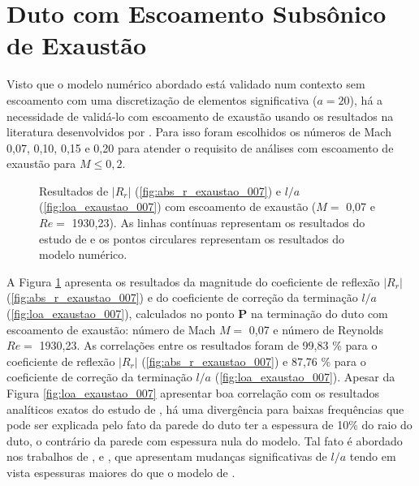 



\newpage
\section{Duto com Escoamento Subsônico de Exaustão}

Visto que o modelo numérico abordado está validado num contexto sem escoamento com uma discretização de elementos significativa ($a = 20$), há a necessidade de validá-lo com escoamento de exaustão usando os resultados na literatura desenvolvidos por . Para isso foram escolhidos os números de Mach 0,07, 0,10, 0,15 e 0,20 para atender o requisito de  análises com escoamento de exaustão para $M \leq 0,2$.

\begin{figure}[ht!]
\begin{subfigure}{\scaleA \textwidth}
  
\end{subfigure}%
\begin{subfigure}{\scaleA \textwidth}
  
\end{subfigure}
\caption[Resultados de $|R_{r}|$ e $l/a$ com escoamento de exaustão ($M =$ 0,07 e $Re =$ 1930,23)]{Resultados de $|R_{r}|$ (\ref{fig:abs_r_exaustao_007}) e $l/a$ (\ref{fig:loa_exaustao_007}) com escoamento de exaustão ($M =$ 0,07 e $Re =$ 1930,23). As linhas contínuas representam os resultados do estudo de  e os pontos circulares representam os resultados do modelo numérico.}
\label{fig:resultados_exaustao_007}
\end{figure}

A Figura \ref{fig:resultados_exaustao_007} apresenta os resultados da magnitude do coeficiente de reflexão $|R_{r}|$ (\ref{fig:abs_r_exaustao_007}) e do coeficiente de correção da terminação $l/a$ (\ref{fig:loa_exaustao_007}), calculados no ponto $\textbf{P}$ na terminação do duto com escoamento de exaustão: número de Mach $M =$ 0,07 e número de Reynolds $Re =$ 1930,23.  As correlações entre os resultados foram de 99,83 \% para o coeficiente de reflexão $|R_{r}|$ (\ref{fig:abs_r_exaustao_007}) e 87,76 \% para o coeficiente de correção da terminação $l/a$ (\ref{fig:loa_exaustao_007}). Apesar da Figura \ref{fig:loa_exaustao_007} apresentar boa correlação com os resultados analíticos exatos do estudo de , há uma divergência para baixas frequências que pode ser explicada pelo fato da parede do duto ter a espessura de 10\% do raio do duto, o contrário da parede com espessura nula do modelo. Tal fato é abordado nos trabalhos de ,  e , que apresentam mudanças significativas de $l/a$ tendo em vista espessuras maiores do que o modelo de .


